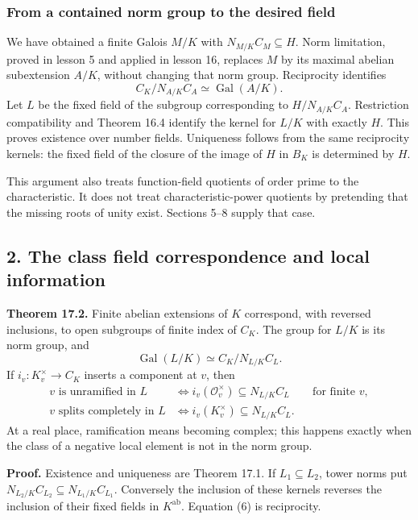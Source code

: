 \documentclass[11pt,a4paper]{article}
\begin{document}
\subsubsection{From a contained norm group to the desired
field}\label{from-a-contained-norm-group-to-the-desired-field}

We have obtained a finite Galois \(M/K\) with \(N_{M/K}C_M\subseteq H\).
Norm limitation, proved in lesson 5 and applied in lesson 16, replaces
\(M\) by its maximal abelian subextension \(A/K\), without changing that
norm group. Reciprocity identifies \[
C_K/N_{A/K}C_A\simeq\operatorname{Gal}(A/K).
\] Let \(L\) be the fixed field of the subgroup corresponding to
\(H/N_{A/K}C_A\). Restriction compatibility and Theorem 16.4 identify
the kernel for \(L/K\) with exactly \(H\). This proves existence over
number fields. Uniqueness follows from the same reciprocity kernels: the
fixed field of the closure of the image of \(H\) in \(B_K\) is
determined by \(H\).

This argument also treats function-field quotients of order prime to the
characteristic. It does not treat characteristic-power quotients by
pretending that the missing roots of unity exist. Sections 5--8 supply
that case.

\subsection{2. The class field correspondence and local
information}\label{the-class-field-correspondence-and-local-information}

\textbf{Theorem 17.2.} Finite abelian extensions of \(K\) correspond,
with reversed inclusions, to open subgroups of finite index of \(C_K\).
The group for \(L/K\) is its norm group, and \[
\operatorname{Gal}(L/K)\simeq C_K/N_{L/K}C_L.
\tag{6}
\] If \(i_v:K_v^\times\to C_K\) inserts a component at \(v\), then \[
\begin{aligned}
v\text{ is unramified in }L&\iff i_v(\mathcal O_v^\times)\subseteq N_{L/K}C_L
&&\text{for finite }v,\\
v\text{ splits completely in }L&\iff i_v(K_v^\times)\subseteq N_{L/K}C_L.
\end{aligned}
\tag{7}
\] At a real place, ramification means becoming complex; this happens
exactly when the class of a negative local element is not in the norm
group.

\textbf{Proof.} Existence and uniqueness are Theorem 17.1. If
\(L_1\subseteq L_2\), tower norms put
\(N_{L_2/K}C_{L_2}\subseteq N_{L_1/K}C_{L_1}\). Conversely the inclusion
of these kernels reverses the inclusion of their fixed fields in
\(K^{\mathrm{ab}}\). Equation (6) is reciprocity.
\end{document}
